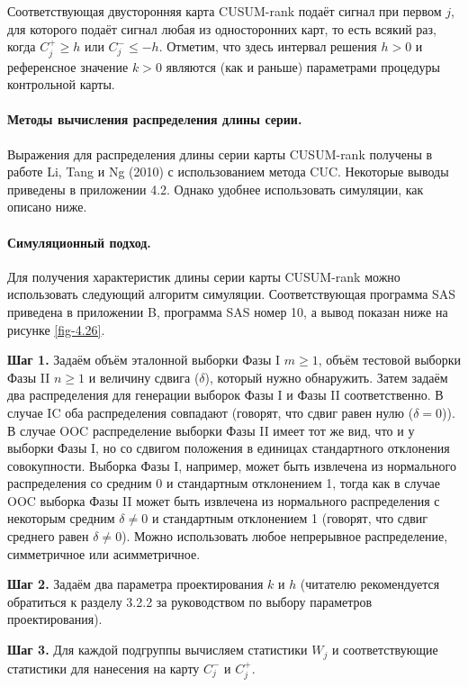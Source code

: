 Соответствующая двусторонняя карта CUSUM-rank подаёт сигнал при первом \(j\), для которого подаёт сигнал любая из односторонних карт, то есть всякий раз, когда \(C_j^+ \ge h\) или \(C_j^- \le -h\). Отметим, что здесь интервал решения \(h > 0\) и референсное значение \(k > 0\) являются (как и раньше) параметрами процедуры контрольной карты.

\paragraph{Методы вычисления распределения длины серии.} Выражения для распределения длины серии карты CUSUM-rank получены в работе Li, Tang и Ng (2010) с использованием метода CUC. Некоторые выводы приведены в приложении 4.2. Однако удобнее использовать симуляции, как описано ниже.

\paragraph{Симуляционный подход.} Для получения характеристик длины серии карты CUSUM-rank можно использовать следующий алгоритм симуляции. Соответствующая программа SAS приведена в приложении B, программа SAS номер 10, а вывод показан ниже на рисунке \ref{fig-4.26}.

\noindent\textbf{Шаг 1.} Задаём объём эталонной выборки Фазы I \(m \ge 1\), объём тестовой выборки Фазы II \(n \ge 1\) и величину сдвига (\(\delta\)), который нужно обнаружить. Затем задаём два распределения для генерации выборок Фазы I и Фазы II соответственно. В случае IC оба распределения совпадают (говорят, что сдвиг равен нулю (\(\delta = 0\))). В случае OOC распределение выборки Фазы II имеет тот же вид, что и у выборки Фазы I, но со сдвигом положения в единицах стандартного отклонения совокупности. Выборка Фазы I, например, может быть извлечена из нормального распределения со средним 0 и стандартным отклонением 1, тогда как в случае OOC выборка Фазы II может быть извлечена из нормального распределения с некоторым средним \(\delta \ne 0\) и стандартным отклонением 1 (говорят, что сдвиг среднего равен \(\delta \ne 0\)). Можно использовать любое непрерывное распределение, симметричное или асимметричное.

\noindent\textbf{Шаг 2.} Задаём два параметра проектирования \(k\) и \(h\) (читателю рекомендуется обратиться к разделу 3.2.2 за руководством по выбору параметров проектирования).

\noindent\textbf{Шаг 3.} Для каждой подгруппы вычисляем статистики \(W_j\) и соответствующие статистики для нанесения на карту \(C_j^-\) и \(C_j^+\).

